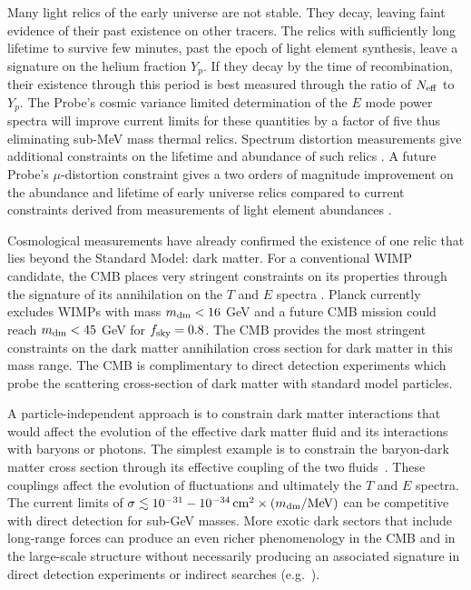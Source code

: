 Many light relics of the early universe are not stable. They decay, 
leaving faint evidence of their past existence on other tracers. The relics with sufficiently long lifetime to survive few minutes, 
past the epoch of light element synthesis, leave a signature on the helium fraction $Y_p$.  If they decay 
by the time of recombination, their existence through this period is best measured through the ratio of ${N_{\rm eff}}$ to $Y_p$. 
The Probe's cosmic variance limited determination 
of the $E$ mode power spectra will improve current limits for these quantities by
a factor of five thus eliminating sub-MeV mass thermal relics. 
%  
Spectrum distortion measurements give additional constraints on the lifetime and abundance 
of such relics \citep{Sarkar1984, Kawasaki1986, Hu1993b, Chluba2011therm}. A future Probe's $\mu$-distortion constraint gives a two orders of magnitude improvement on the abundance and lifetime of early universe relics \cite{Chluba2013fore, Chluba2013PCA} compared to current constraints derived from measurements of light element abundances \cite{Kawasaki2005, Jedamzik2006}.

Cosmological measurements have already confirmed the existence of one relic that lies beyond the 
Standard Model: dark matter. For a conventional WIMP candidate, the CMB places very stringent 
constraints on its properties through the signature of its annihilation on the $T$ and $E$ 
spectra \citep{Peebles2000, Chen2004, Padmanabhan2005}.  Planck currently excludes WIMPs with mass 
$m_{\rm dm}< 16$ GeV and a future CMB mission could reach $m_{\rm dm} < 45$ GeV for $f_{\rm sky} =0.8$.  The 
CMB provides the most stringent constraints on the dark matter annihilation cross section for dark matter 
in this mass range.  The CMB is complimentary to direct detection experiments which probe the scattering 
cross-section of dark matter with standard model particles.


A particle-independent approach is to constrain dark matter interactions that would 
affect the evolution of the effective dark matter fluid and its interactions with baryons or photons.  The simplest example is 
to constrain the baryon-dark matter cross section through its effective coupling of the two fluids~\cite{Dvorkin:2013cea}.  
These couplings affect the evolution of fluctuations and ultimately the $T$ and $E$ spectra. The current limits of $\sigma \lesssim 10^{-31}-10^{-34}\,{\rm cm}^2 \times (m_{\rm dm} / {\rm MeV})$ can be competitive with direct detection for sub-GeV masses.  
More exotic dark sectors that include long-range forces can produce an even richer phenomenology in the CMB and in the large-scale structure 
without necessarily producing an associated signature in direct detection experiments or 
indirect searches (e.g.~\cite{Cyr-Racine:2013fsa,Buen-Abad:2015ova,Lesgourgues:2015wza}). 

